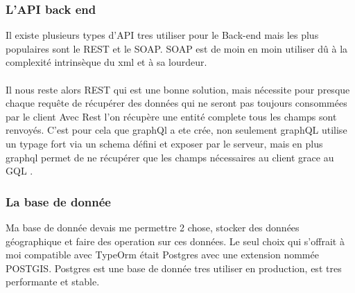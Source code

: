 \subsubsection{L'API back end}
Il existe plusieurs types d'API tres utiliser pour le Back-end mais les plus populaires sont le REST et le SOAP\@.
SOAP est de moin en moin utiliser dû à la complexité intrinsèque du xml et à sa lourdeur.\\\\
Il nous reste alors REST qui est une bonne solution, mais nécessite pour presque chaque requête de récupérer des données qui ne seront pas toujours consommées par le client
Avec Rest l'on récupère une entité complete tous les champs sont renvoyés.
C'est pour cela que graphQl a ete crée, non seulement graphQL utilise un typage fort via un schema défini et exposer par le serveur,
mais en plus graphql permet de ne récupérer que les champs nécessaires au client grace au GQL .

\subsubsection{La base de donnée}
Ma base de donnée devais me permettre 2 chose, stocker des données géographique et faire des operation sur ces données.
Le seul choix qui s'offrait à moi compatible avec TypeOrm était Postgres avec une extension nommée POSTGIS\@.
Postgres est une base de donnée tres utiliser en production, est tres performante et stable.

